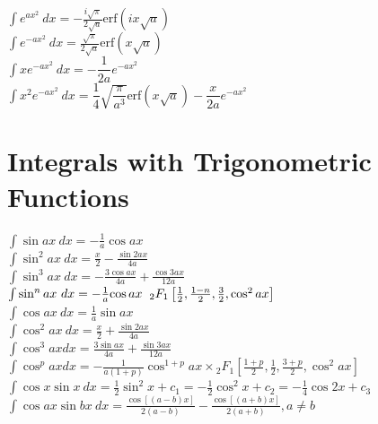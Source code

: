 \documentclass[10pt,letterpaper,landscape]{cheatsheet}
\begin{document}
$
\int e^{ax^2}\ dx = -\frac{i\sqrt{\pi}}{2\sqrt{a}}\text{erf}\left(ix\sqrt{a}\right) 
$\\

$
\int e^{-ax^2}\ dx = \frac{\sqrt{\pi}}{2\sqrt{a}}\text{erf}\left(x\sqrt{a}\right) 
$\\

$
\int x e^{-ax^2}\ {dx} = -\dfrac{1}{2a}e^{-ax^2} 
$\\

$
\int x^2 e^{-ax^2}\ {dx} = \dfrac{1}{4}\sqrt{\dfrac{\pi}{a^3}}\text{erf}(x\sqrt{a}) -\dfrac{x}{2a}e^{-ax^2}
$\\


\section* {Integrals with Trigonometric Functions}

$
\int \sin ax \ dx = -\frac{1}{a} \cos ax 
$\\

$
\int \sin^2 ax\  dx = \frac{x}{2} - \frac{\sin 2ax} {4a} 
$\\

$
\int \sin^3 ax \ dx = -\frac{3 \cos ax}{4a} + \frac{\cos 3ax} {12a} 
$\\

$
\int \sin^n ax \ dx =
 -\frac{1}{a}{\cos ax} \hspace{2mm}{_2F_1}\left[
\frac{1}{2}, \frac{1-n}{2}, \frac{3}{2}, \cos^2 ax
\right] 
$\\



$
\int \cos ax\ dx= \frac{1}{a} \sin ax 
$\\

$
\int \cos^2 ax\ dx = \frac{x}{2}+\frac{ \sin 2ax}{4a} 
$\\

$
\int \cos^3 ax dx = \frac{3 \sin ax}{4a}+\frac{ \sin 3ax}{12a} 
$\\

$
\int \cos^p ax dx  = -\frac{1}{a(1+p)}{\cos^{1+p} ax} \times 
{_2F_1}\left[
\frac{1+p}{2}, \frac{1}{2}, \frac{3+p}{2}, \cos^2 ax
\right] 
$\\

$
\int \cos x \sin x\ dx = \frac{1}{2}\sin^2 x + c_1 = -\frac{1}{2} \cos^2x + c_2 = -\frac{1}{4} \cos 2x + c_3
$\\

$
\int \cos ax \sin bx\ dx = \frac{\cos[(a-b) x]}{2(a-b)} -
 \frac{\cos[(a+b)x]}{2(a+b)} , a\ne b
$\\
\end{document}
